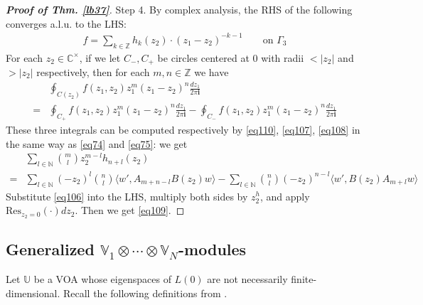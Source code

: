 \documentclass[11pt,b5paper,notitlepage]{article}
\theoremstyle{definition}
\theoremstyle{plain}
\newcommand{\Res}{\mathrm{Res}}
\newcommand{\im}{\mathbf{i}}
\newcommand{\Vbb}{\mathbb V}
\newcommand{\Ubb}{\mathbb U}
\newcommand{\Wbb}{\mathbb W}
\newcommand{\Cbb}{\mathbb C}
\newcommand{\Nbb}{\mathbb N}
\newcommand{\Zbb}{\mathbb Z}
\newcommand{\<}{\left\langle}
\renewcommand{\>}{\right\rangle}
\newcommand{\fx}{\mathfrak{X}}
\newcommand{\bigbk}[1]{\big\langle {#1}\big\rangle}
\newcommand{\bbs}{\boxbackslash}
\numberwithin{equation}{section}
\begin{document}
\begin{proof}[\textbf{Proof of Thm. \ref{lb37}}]
Step 4. By complex analysis, the RHS of the following converges a.l.u. to the LHS:
\begin{align}
f=\sum_{k\in\Zbb} h_k(z_2)\cdot (z_1-z_2)^{-k-1} \qquad\text{on }\Gamma_3  \label{eq110}
\end{align}
For each $z_2\in\Cbb^\times$, if we let $C_-,C_+$ be circles centered at $0$ with radii $<|z_2|$ and $>|z_2|$ respectively, then for each $m,n\in\Zbb$ we have
\begin{align*}
&\oint_{C(z_2)}f(z_1,z_2)z_1^m(z_1-z_2)^n\frac{dz_1}{2\pi\im}\\
=&\oint_{C_+}f(z_1,z_2)z_1^m(z_1-z_2)^n\frac{dz_1}{2\pi\im}-\oint_{C_-}f(z_1,z_2)z_1^m(z_1-z_2)^n\frac{dz_1}{2\pi\im}
\end{align*}
These three integrals can be computed respectively by \eqref{eq110}, \eqref{eq107}, \eqref{eq108} in the same way as \eqref{eq74} and \eqref{eq75}: we get
\begin{align*}
&\sum_{l\in\Nbb}{m\choose l}z_2^{m-l}h_{n+l}(z_2)\\
=&\sum_{l\in\Nbb}(-z_2)^l{n\choose l}\bigbk{w',A_{m+n-l}B(z_2)w}-\sum_{l\in\Nbb}{n\choose l}(-z_2)^{n-l}\bigbk{w',B(z_2)A_{m+l}w}
\end{align*}
Substitute \eqref{eq106} into the LHS, multiply both sides by $z_2^h$, and apply $\Res_{z_2=0}(\cdot)dz_2$. Then we get \eqref{eq109}.
\end{proof}



\subsection{Generalized $\Vbb_1\otimes\cdots\otimes\Vbb_N$-modules}  \label{lb35}


Let $\Ubb$ be a VOA whose eigenspaces of $L(0)$ are not necessarily finite-dimensional. Recall the following definitions from \cite{Hua-projectivecover}.
\end{document}
